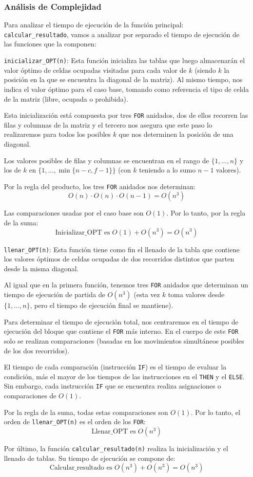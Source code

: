 \subsubsection{Análisis de Complejidad}
Para analizar el tiempo de ejecución de la función principal: \texttt{calcular\_resultado}, vamos a analizar por separado el tiempo de ejecución de las funciones que la componen:

\texttt{inicializar\_OPT(n)}: Esta función inicializa las tablas que luego almacenarán el valor óptimo de celdas ocupadas visitadas para cada valor de \( k \) (siendo \( k \) la posición en la que se encuentra la diagonal de la matriz). Al mismo tiempo, nos indica el valor óptimo para el caso base, tomando como referencia el tipo de celda de la matriz (libre, ocupada o prohibida).

Esta inicialización está compuesta por tres \texttt{FOR} anidados, dos de ellos recorren las filas y columnas de la matriz y el tercero nos asegura que este paso lo realizaremos para todos los posibles \( k \) que nos determinen la posición de una diagonal.

Los valores posibles de filas y columnas se encuentran en el rango de \(\{1,\ldots,n\}\) y los de \( k \) en \(\{1,\ldots,\min\{n-c,f-1\}\}\) (con \( k \) teniendo a lo sumo \( n-1 \) valores).

Por la regla del producto, los tres \texttt{FOR} anidados nos determinan:
\[
	O(n) \cdot O(n) \cdot O(n-1) = O(n^3)
\]

Las comparaciones usadas por el caso base son \( O(1) \). Por lo tanto, por la regla de la suma:
\[
	\text{Inicializar\_OPT es } O(1) + O(n^3) = O(n^3)
\]

\texttt{llenar\_OPT(n)}: Esta función tiene como fin el llenado de la tabla que contiene los valores óptimos de celdas ocupadas de dos recorridos distintos que parten desde la misma diagonal.

Al igual que en la primera función, tenemos tres \texttt{FOR} anidados que determinan un tiempo de ejecución de partida de \( O(n^3) \) (esta vez \( k \) toma valores desde \(\{1,\ldots,n\}\), pero el tiempo de ejecución final se mantiene).

Para determinar el tiempo de ejecución total, nos centraremos en el tiempo de ejecución del bloque que contiene el \texttt{FOR} más interno. En el cuerpo de este \texttt{FOR} solo se realizan comparaciones (basadas en los movimientos simultáneos posibles de los dos recorridos).

El tiempo de cada comparación (instrucción \texttt{IF}) es el tiempo de evaluar la condición, más el mayor de los tiempos de las instrucciones en el \texttt{THEN} y el \texttt{ELSE}. Sin embargo, cada instrucción \texttt{IF} que se encuentra realiza asignaciones o comparaciones de \( O(1) \).

Por la regla de la suma, todas estas comparaciones son \( O(1) \). Por lo tanto, el orden de \texttt{llenar\_OPT(n)} es el orden de los \texttt{FOR}:
\[
	\text{Llenar\_OPT es } O(n^3)
\]

Por último, la función \texttt{calcular\_resultado(n)} realiza la inicialización y el llenado de tablas. Su tiempo de ejecución se compone de:
\[
	\text{Calcular\_resultado es } O(n^3) + O(n^3) = O(n^3)
\]